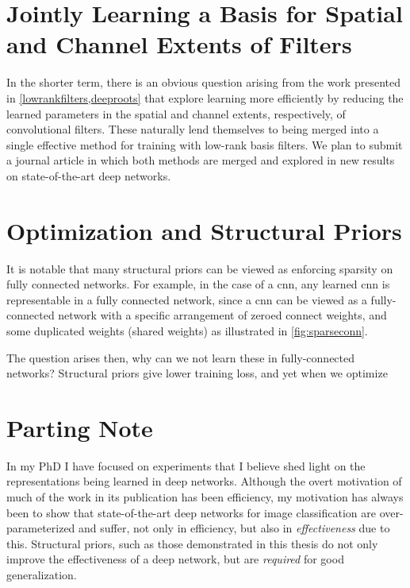 \documentclass[thesis]{subfiles}
\begin{document}
\section{Jointly Learning a Basis for Spatial and Channel Extents of Filters}
\label{journalplan}
In the shorter term, there is an obvious question arising from the work presented in \cref{lowrankfilters,deeproots} that explore learning more efficiently by reducing the learned parameters in the spatial and channel extents, respectively, of convolutional filters. These naturally lend themselves to being merged into a single effective method for training with low-rank basis filters. We plan to submit a journal article in which both methods are merged and explored in new results on state-of-the-art deep networks.

\section{Optimization and Structural Priors}
It is notable that many structural priors can be viewed as enforcing sparsity on fully connected networks. For example, in the case of a \gls{cnn}, any learned \gls{cnn} is representable in a fully connected network, since a \gls{cnn} can be viewed as a fully-connected network with a specific arrangement of zeroed connect weights, and some duplicated weights (shared weights) as illustrated in \cref{fig:sparseconn}.

The question arises then, why can we not learn these in fully-connected networks? Structural priors give lower training loss, and yet when we optimize 
\section{Parting Note}
In my PhD I have focused on experiments that I believe shed light on the representations being learned in deep networks. Although the overt motivation of much of the work in its publication has been efficiency, my motivation has always been to show that state-of-the-art deep networks for image classification are over-parameterized and suffer, not only in efficiency, but also in \emph{effectiveness} due to this. Structural priors, such as those demonstrated in this thesis do not only improve the effectiveness of a deep network, but are \emph{required} for good generalization.
\end{document}
